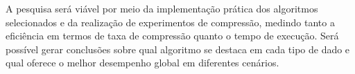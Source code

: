 A pesquisa será viável por meio da implementação prática dos algoritmos selecionados e da realização de experimentos de compressão, medindo tanto a eficiência em termos de taxa de compressão quanto o tempo de execução. Será possível gerar conclusões sobre qual algoritmo se destaca em cada tipo de dado e qual oferece o melhor desempenho global em diferentes cenários.


